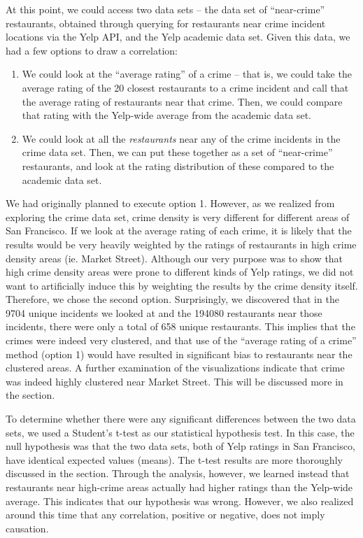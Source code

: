 \documentclass{article}
\begin{document}
At this point, we could access two data sets -- the data set of
``near-crime'' restaurants, obtained through querying for restaurants near
crime incident locations via the Yelp API, and the Yelp academic data
set. Given this data, we had a few options to draw a correlation:
\begin{enumerate}
\item We could look at the ``average rating'' of a crime -- that is, we
  could take the average rating of the 20 closest restaurants to a crime
  incident and call that the average rating of restaurants near that
  crime. Then, we could compare that rating with the Yelp-wide average from
  the academic data set.
\item We could look at all the \textit{restaurants} near any of the crime
  incidents in the crime data set. Then, we can put these together as a set
  of ``near-crime'' restaurants, and look at the rating distribution of
  these compared to the academic data set.
\end{enumerate}
We had originally planned to execute option 1. However, as we realized from
exploring the crime data set, crime density is very different for different
areas of San Francisco. If we look at the average rating of each crime, it
is likely that the results would be very heavily weighted by the ratings of
restaurants in high crime density areas (ie. Market Street). Although our
very purpose was to show that high crime density areas were prone to
different kinds of Yelp ratings, we did not want to artificially induce
this by weighting the results by the crime density itself. Therefore, we
chose the second option. Surprisingly, we discovered that in the 9704
unique incidents we looked at and the 194080 restaurants near those
incidents, there were only a total of 658 unique restaurants. This implies
that the crimes were indeed very clustered, and that use of the ``average
rating of a crime'' method (option 1) would have resulted in significant
bias to restaurants near the clustered areas. A further examination of the
visualizations indicate that crime was indeed highly clustered near Market
Street. This will be discussed more in the \textbf{}
section.

To determine whether there were any significant differences between the two
data sets, we used a Student's t-test as our statistical hypothesis
test. In this case, the null hypothesis was that the two data sets, both of
Yelp ratings in San Francisco, have identical expected values (means). The
t-test results are more thoroughly discussed in the
\textbf{} section. Through the analysis, however, we
learned instead that restaurants near high-crime areas actually had higher
ratings than the Yelp-wide average. This indicates that our hypothesis was
wrong. However, we also realized around this time that any correlation,
positive or negative, does not imply causation.
\end{document}
